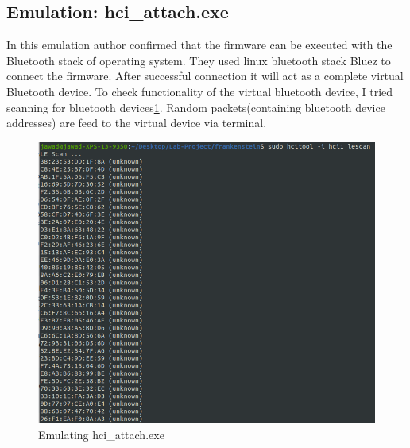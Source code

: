 \documentclass[letterpaper,11pt]{article}
\begin{document}
\subsection{Emulation: hci\_attach.exe} 
In this emulation author confirmed that the firmware can be executed with the Bluetooth stack of operating system. They used linux bluetooth stack Bluez to connect the firmware. After successful connection it will act as a complete virtual Bluetooth device. To check functionality of the virtual bluetooth device, I tried scanning for bluetooth devices\ref{fig:hci_attach.exe}. Random packets(containing bluetooth device addresses) are feed to the virtual device via terminal. 
\begin{figure}[!h]
    \centering
    \includegraphics[width=\textwidth]{images/scanning_devices.png}
    \caption{Emulating hci\_attach.exe}
    \label{fig:hci_attach.exe}
\end{figure}
\end{document}
